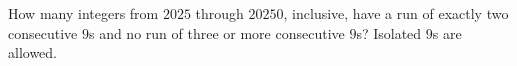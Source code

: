 How many integers from $2025$ through $20250$, inclusive, have a run of exactly two consecutive $9$s and no run of three or more consecutive $9$s? Isolated $9$s are allowed.
